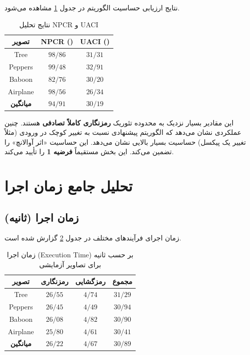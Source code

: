 \documentclass[a4paper,12pt]{report}
\renewcommand{\%}{\lr{\oldpercent}}
\providecommand{\lr}[1]{#1}
\begin{document}
نتایج ارزیابی حساسیت الگوریتم در جدول \ref{tab:npcr_uaci_results} مشاهده می‌شود.

\begin{table}[h]
\centering
\caption{نتایج تحلیل \lr{NPCR} و \lr{UACI}} \label{tab:npcr_uaci_results}
\begin{tabular}{|c|c|c|}
\hline
\textbf{تصویر} & \textbf{\lr{NPCR (\%)}} & \textbf{\lr{UACI (\%)}} \\ \hline
\lr{Tree} & $98/86$ & $31/31$ \\ \hline
\lr{Peppers} & $99/48$ & $32/91$ \\ \hline
\lr{Baboon} & $82/76$ & $30/20$ \\ \hline
\lr{Airplane} & $98/56$ & $26/34$ \\ \hline
\textbf{میانگین} & $94/91$ & $30/19$ \\ \hline
\end{tabular}
\end{table}

این مقادیر بسیار نزدیک به محدوده تئوریک \textbf{رمزنگاری کاملاً تصادفی} هستند. چنین عملکردی نشان می‌دهد که الگوریتم پیشنهادی نسبت به تغییر کوچک در ورودی (مثلاً تغییر یک پیکسل) حساسیت بسیار بالایی نشان می‌دهد. این حساسیت «اثر آوالانچ» را تضمین می‌کند. این بخش مستقیماً \textbf{فرضیه 1} را تأیید می‌کند.

\section{تحلیل جامع زمان اجرا}
\subsection{زمان اجرا (ثانیه)}
زمان اجرای فرآیندهای مختلف در جدول \ref{tab:execution_time} گزارش شده است.

\begin{table}[h]
\centering
\caption{زمان اجرا (\lr{Execution Time}) بر حسب ثانیه برای تصاویر آزمایشی} \label{tab:execution_time}
\begin{tabular}{|c|c|c|c|}
\hline
\textbf{تصویر} & \textbf{رمزنگاری} & \textbf{رمزگشایی} & \textbf{مجموع} \\ \hline
\lr{Tree} & $26/55$ & $4/74$ & $31/29$ \\ \hline
\lr{Peppers} & $26/45$ & $4/49$ & $30/94$ \\ \hline
\lr{Baboon} & $26/08$ & $4/82$ & $30/90$ \\ \hline
\lr{Airplane} & $25/80$ & $4/61$ & $30/41$ \\ \hline
\textbf{میانگین} & $26/22$ & $4/67$ & $30/89$ \\ \hline
\end{tabular}
\end{table}
\end{document}
